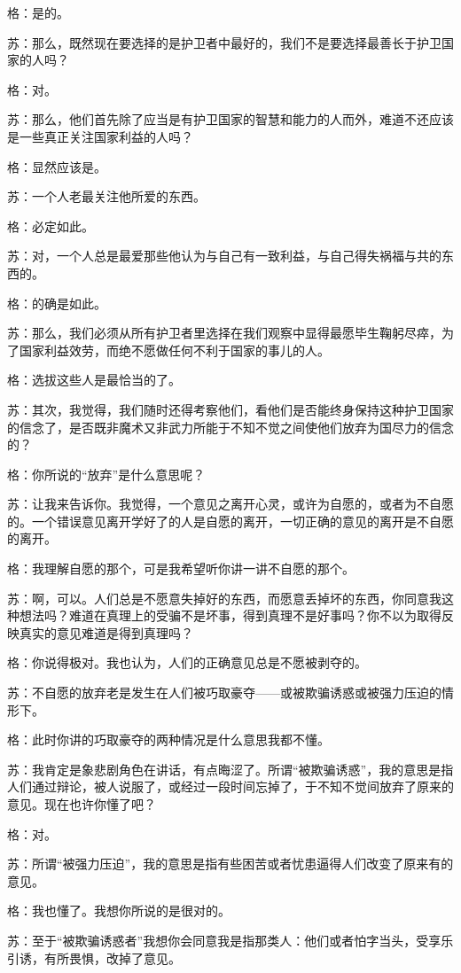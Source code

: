 \documentclass[11pt,oneside]{book}
\begin{document}
\begin{common-format}
格：是的。

苏：那么，既然现在要选择的是护卫者中最好的，我们不是要选择最善长于护卫国家的人吗？

格：对。

苏：那么，他们首先除了应当是有护卫国家的智慧和能力的人而外，难道不还应该是一些真正关注国家利益的人吗？

格：显然应该是。

苏：一个人老最关注他所爱的东西。

格：必定如此。

苏：对，一个人总是最爱那些他认为与自己有一致利益，与自己得失祸福与共的东西的。

格：的确是如此。

苏：那么，我们必须从所有护卫者里选择在我们观察中显得最愿毕生鞠躬尽瘁，为了国家利益效劳，而绝不愿做任何不利于国家的事儿的人。

格：选拔这些人是最恰当的了。

苏：其次，我觉得，我们随时还得考察他们，看他们是否能终身保持这种护卫国家的信念了，是否既非魔术又非武力所能于不知不觉之间使他们放弃为国尽力的信念的？

格：你所说的“放弃”是什么意思呢？

苏：让我来告诉你。我觉得，一个意见之离开心灵，或许为自愿的，或者为不自愿的。一个错误意见离开学好了的人是自愿的离开，一切正确的意见的离开是不自愿的离开。

格：我理解自愿的那个，可是我希望听你讲一讲不自愿的那个。

苏：啊，可以。人们总是不愿意失掉好的东西，而愿意丢掉坏的东西，你同意我这种想法吗？难道在真理上的受骗不是坏事，得到真理不是好事吗？你不以为取得反映真实的意见难道是得到真理吗？

格：你说得极对。我也认为，人们的正确意见总是不愿被剥夺的。

苏：不自愿的放弃老是发生在人们被巧取豪夺——或被欺骗诱惑或被强力压迫的情形下。

格：此时你讲的巧取豪夺的两种情况是什么意思我都不懂。

苏：我肯定是象悲剧角色在讲话，有点晦涩了。所谓“被欺骗诱惑”，我的意思是指人们通过辩论，被人说服了，或经过一段时间忘掉了，于不知不觉间放弃了原来的意见。现在也许你懂了吧？

格：对。

苏：所谓“被强力压迫”，我的意思是指有些困苦或者忧患逼得人们改变了原来有的意见。

格：我也懂了。我想你所说的是很对的。

苏：至于“被欺骗诱惑者”我想你会同意我是指那类人：他们或者怕字当头，受享乐引诱，有所畏惧，改掉了意见。


\end{common-format}
\end{document}
